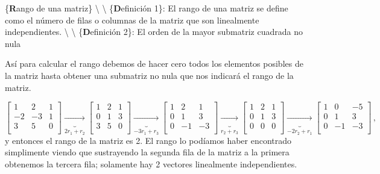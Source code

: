 \documentclass[
]{agujournal2019}
\begin{document}
\vspace{0.5cm}

\{\noindent \textbf Rango de una matriz\} \textbackslash{}
\textbackslash{} \{\textbf Definición 1\}: El rango de una matriz se
define como el número de filas o columnas de la matriz que son
linealmente independientes. \textbackslash{} \textbackslash{}
\{\textbf Definición 2\}: El orden de la mayor submatriz cuadrada no
nula

Así para calcular el rango debemos de hacer cero todos los elementos
posibles de la matriz hasta obtener una submatriz no nula que nos
indicará el rango de la matriz.

\[\left[\begin{array}{cccc}
  1 & 2 & 1\\
  -2 & -3 & 1\\
  3 & 5 & 0\\
\end{array}\right]\underbrace{\rightarrow}_{2r_1+r_2}
\left[\begin{array}{cccc}
 1 & 2 & 1\\
  0 & 1 & 3\\
  3 & 5 & 0\\
\end{array}\right]\underbrace{\rightarrow}_{-3r_1+r_3}
\left[\begin{array}{cccc}
 1 & 2 & 1\\
  0 & 1 & 3\\
  0 & -1 & -3\\
\end{array}\right]\underbrace{\rightarrow}_{r_2+r_3}
\left[\begin{array}{cccc}
 1 & 2 & 1\\
  0 & 1 & 3\\
  0 & 0 & 0\\
\end{array}\right]\underbrace{\rightarrow}_{-2r_2+r_1}
\left[\begin{array}{cccc}
 1 & 0 & -5\\
  0 & 1 & 3\\
  0 & -1 & -3\\
\end{array}\right]\,,\] y entonces el rango de la matriz es 2. El rango
lo podíamos haber encontrado simplimente viendo que sustrayendo la
segunda fila de la matriz a la primera obtenemos la tercera fila;
solamente hay 2 vectores linealmente independientes.

\vspace{0.5cm}
\end{document}
